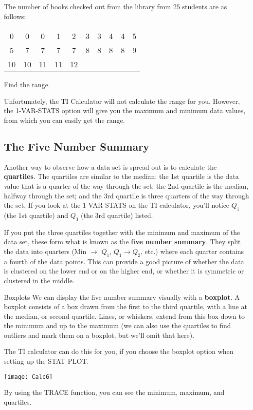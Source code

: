 \begin{try}
The number of books checked out from the library from 25 students are as follows:\begin{center}
\begin{tabular}{c c c c c c c c c c}
0 & 0 & 0 & 1 & 2 & 3 & 3 & 4 & 4 & 5\\
5 & 7 & 7 & 7 & 7 & 8 & 8 & 8 & 8 & 9\\
10 & 10 & 11 & 11 & 12 & & & & &
\end{tabular}
\end{center}
Find the range.
\end{try}

Unfortunately, the TI Calculator will not calculate the range for you. However, the 1-VAR-STATS option will give you the maximum and minimum data values, from which you can easily get the range.
\pagebreak

\subsection{The Five Number Summary}
Another way to observe how a data set is spread out is to calculate the \textbf{quartiles}.  The quartiles are similar to the median: the 1st quartile is the data value that is a quarter of the way through the set; the 2nd quartile is the median, halfway through the set; and the 3rd quartile is three quarters of the way through the set.  If you look at the 1-VAR-STATS on the TI calculator, you'll notice $Q_1$ (the 1st quartile) and $Q_3$ (the 3rd quartile) listed.

If you put the three quartiles together with the minimum and maximum of the data set, these form what is known as the \textbf{five number summary}.  They split the data into quarters (Min $\to$ $Q_1$, $Q_1 \to Q_2$, etc.) where each quarter contains a fourth of the data points.  This can provide a good picture of whether the data is clustered on the lower end or on the higher end, or whether it is symmetric or clustered in the middle.

\begin{proc}{Boxplots}
We can display the five number summary visually with a \textbf{boxplot}.  A boxplot consists of a box drawn from the first to the third quartile, with a line at the median, or second quartile.  Lines, or whiskers, extend from this box down to the minimum and up to the maximum (we can also use the quartiles to find outliers and mark them on a boxplot, but we'll omit that here).

The TI calculator can do this for you, if you choose the boxplot option when setting up the STAT PLOT.
\begin{center}
\texttt{[image: Calc6]}
\end{center}
By using the TRACE function, you can see the minimum, maximum, and quartiles.
\end{proc}

